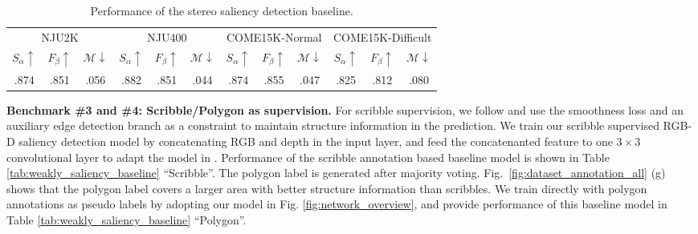 \documentclass[10pt,twocolumn,letterpaper]{article}
\def\ourdataset{COME15K}
\begin{document}
\begin{table}[t!]
  \centering
  \scriptsize
  \renewcommand{\arraystretch}{1.0}
  \renewcommand{\tabcolsep}{0.5mm}
  \caption{Performance of the stereo saliency detection baseline.
  }
  \begin{tabular}{ccc|ccc|ccc|ccc}
  \hline
\multicolumn{3}{c|}{NJU2K\cite{NJU2000}}&\multicolumn{3}{c|}{NJU400\cite{NJU400}}&\multicolumn{3}{c|}{\ourdataset-Normal}&\multicolumn{3}{c}{\ourdataset-Difficult} \\
    $S_{\alpha}\uparrow$ & $F_{\beta}\uparrow$ & $\mathcal{M}\downarrow$
    & $S_{\alpha}\uparrow$ & $F_{\beta}\uparrow$ & $\mathcal{M}\downarrow$
    & $S_{\alpha}\uparrow$ & $F_{\beta}\uparrow$ & $\mathcal{M}\downarrow$
    & $S_{\alpha}\uparrow$ & $F_{\beta}\uparrow$ & $\mathcal{M}\downarrow$ \\
  \hline
    .874 & .851 & .056 & .882 & .851 & .044 & .874 & .855 & .047 & .825 & .812 & .080  \\
   \hline
  \end{tabular}
  \label{tab:stereo_saliency_baseline}
\end{table}







\noindent\textbf{Benchmark \#3 and \#4: Scribble/Polygon as supervision.}
For scribble supervision,
we follow \cite{jing2020weakly} and use the smoothness loss and an auxiliary edge detection branch as a constraint to maintain structure information in the prediction.
We train our scribble supervised RGB-D saliency detection model by concatenating RGB and depth in the input layer, and feed the concatenanted feature to one $3\times3$ convolutional layer to adapt the model in \cite{jing2020weakly}. Performance of the scribble annotation based baseline model is shown in Table \ref{tab:weakly_saliency_baseline} \enquote{Scribble}.
The polygon label is generated after
majority voting. Fig.~\ref{fig:dataset_annotation_all} (g) shows that the polygon label covers a larger area with better structure information than scribbles.
We
train directly with polygon annotations as pseudo labels by adopting our model in Fig. \ref{fig:network_overview}, and provide performance of this baseline model in Table \ref{tab:weakly_saliency_baseline} \enquote{Polygon}.
\end{document}

